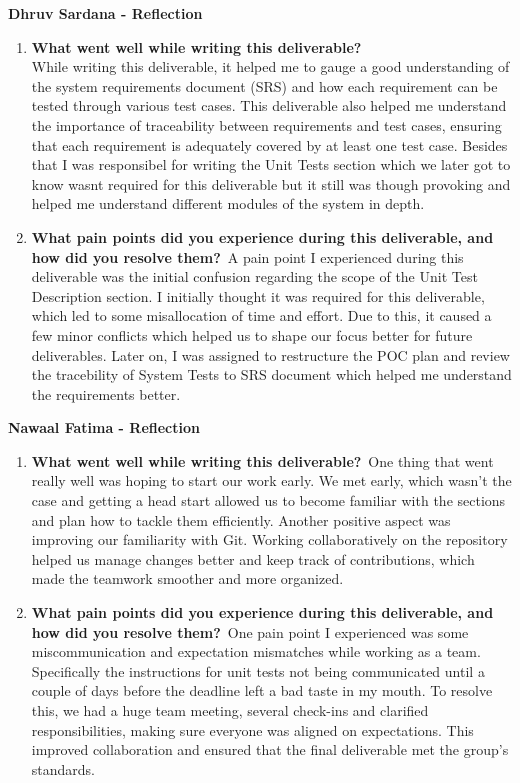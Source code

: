 \documentclass[12pt, titlepage]{article}
\begin{document}
\textbf{Dhruv Sardana - Reflection}
\begin{enumerate}
  \item \textbf{What went well while writing this deliverable?}\\
  While writing this deliverable, it helped me to gauge a good understanding of the system requirements document (SRS) and how each requirement can be tested through various test cases. This deliverable also helped me understand the importance of traceability between requirements and test cases, ensuring that each requirement is adequately covered by at least one test case.
  Besides that I was responsibel for writing the Unit Tests section which we later got to know wasnt required for this deliverable but it still was though provoking and helped me understand different modules of the system in depth.
  
  \item \textbf{What pain points did you experience during this
    deliverable, and how did you resolve them?}\
  A pain point I experienced during this deliverable was the initial confusion regarding the scope of the Unit Test Description section. 
  I initially thought it was required for this deliverable, which led to some misallocation of time and effort. Due to this, it caused a few minor conflicts which helped us to shape our focus better for future deliverables.
  Later on, I was assigned to restructure the POC plan and review the tracebility of System Tests to SRS document which helped me understand the requirements better.
\end{enumerate}

\textbf{Nawaal Fatima - Reflection}
\begin{enumerate}
  \item \textbf{What went well while writing this deliverable?}\
    One thing that went really well was hoping to start our work early.
    We met early, which wasn't the case and getting a head start
    allowed us to become familiar with the
    sections and plan how to tackle them efficiently. Another
    positive aspect was improving our familiarity with Git. Working
    collaboratively on the repository helped us manage changes better
    and keep track of contributions, which made the teamwork smoother
    and more organized.

  \item \textbf{What pain points did you experience during this
    deliverable, and how did you resolve them?}\
    One pain point I experienced was some miscommunication and
    expectation mismatches while working as a team. Specifically the
    instructions for unit tests not being communicated until a couple of
    days before the deadline left a bad taste in my mouth.
    To resolve this, we had a huge team meeting, several check-ins
    and clarified responsibilities, making sure everyone
    was aligned on expectations. This improved collaboration and
    ensured that the final deliverable met the group’s standards.
  \end{enumerate}
\end{document}
